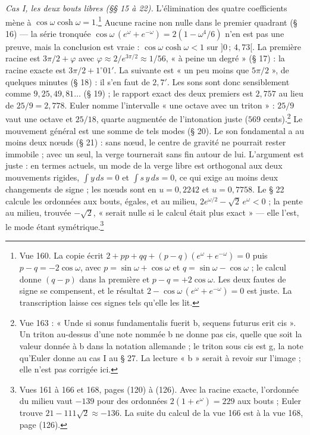 \documentclass[11pt,a4paper]{article}
\begin{document}
\emph{Cas I, les deux bouts libres (§§ 15 à 22).} L'élimination des quatre coefficients mène à $\cos\omega\cosh\omega=1$.\footnote{Vue 160. La copie écrit $2+pp+qq+(p-q)(e^\omega+e^{-\omega})=0$ puis $p-q=-2\cos\omega$, avec $p=\sin\omega+\cos\omega$ et $q=\sin\omega-\cos\omega$ ; le calcul donne $(q-p)$ dans la première et $p-q=+2\cos\omega$. Les deux fautes de signe se compensent, et le résultat $2-\cos\omega\,(e^\omega+e^{-\omega})=0$ est juste. La transcription laisse ces signes tels qu'elle les lit.} Aucune racine non nulle dans le premier quadrant (§ 16) — la série tronquée $\cos\omega\,(e^\omega+e^{-\omega})=2(1-\omega^4/6)$ n'en est pas une preuve, mais la conclusion est vraie : $\cos\omega\cosh\omega<1$ sur $]0\,;\,4{,}73[$. La première racine est $3\pi/2+\varphi$ avec $\varphi\approx 2/e^{3\pi/2}\approx 1/56$, « à peine un degré » (§ 17) : la racine exacte est $3\pi/2+1^\circ 01'$. La suivante est « un peu moins que $5\pi/2$ », de quelques minutes (§ 18) : il s'en faut de $2{,}7'$. Les sons sont donc sensiblement comme $9,25,49,81\dots$ (§ 19) ; le rapport exact des deux premiers est $2{,}757$ au lieu de $25/9=2{,}778$. Euler nomme l'intervalle « une octave avec un triton » : $25/9$ vaut une octave et $25/18$, quarte augmentée de l'intonation juste ($569$ cents).\footnote{Vue 163 : « Unde si sonus fundamentalis fuerit b, sequens futurus erit cis ». Un triton au-dessus d'une note nommée b ne donne pas cis, quelle que soit la valeur donnée à b dans la notation allemande ; le triton sous cis est g, la note qu'Euler donne au cas I au § 27. La lecture « b » serait à revoir sur l'image ; elle n'est pas corrigée ici.} Le mouvement général est une somme de tels modes (§ 20). Le son fondamental a au moins deux nœuds (§ 21) : sans nœud, le centre de gravité ne pourrait rester immobile ; avec un seul, la verge tournerait sans fin autour de lui. L'argument est juste : en termes actuels, un mode de la verge libre est orthogonal aux deux mouvements rigides, $\int y\,ds=0$ et $\int s\,y\,ds=0$, ce qui exige au moins deux changements de signe ; les nœuds sont en $u=0{,}2242$ et $u=0{,}7758$. Le § 22 calcule les ordonnées aux bouts, égales, et au milieu, $2e^{\omega/2}-\sqrt2\,e^\omega<0$ ; la pente au milieu, trouvée $-\sqrt2$, « serait nulle si le calcul était plus exact » — elle l'est, le mode étant symétrique.\footnote{Vues 161 à 166 et 168, pages (120) à (126). Avec la racine exacte, l'ordonnée du milieu vaut $-139$ pour des ordonnées $2(1+e^\omega)=229$ aux bouts ; Euler trouve $21-111\sqrt2\approx-136$. La suite du calcul de la vue 166 est à la vue 168, page (126).}
\end{document}
